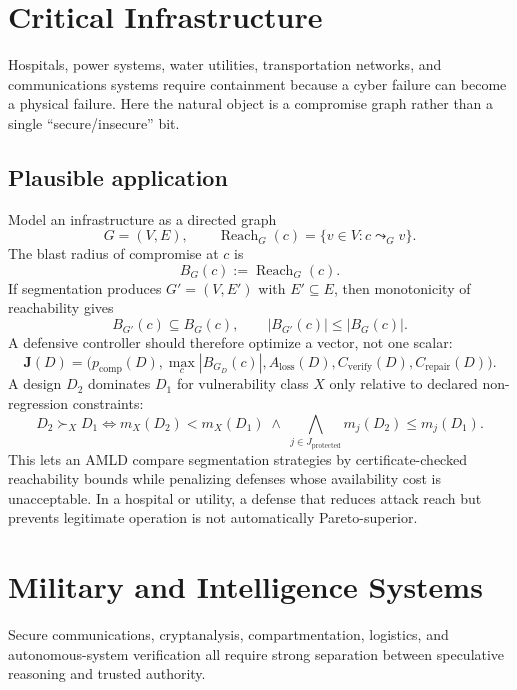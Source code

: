 \documentclass[11pt]{article}
\newcommand{\Reach}{\operatorname{Reach}}
\begin{document}
\section{Critical Infrastructure}
Hospitals, power systems, water utilities, transportation networks, and communications systems require
containment because a cyber failure can become a physical failure. Here the natural object is a
compromise graph rather than a single ``secure/insecure'' bit.

\subsection*{Plausible application}
Model an infrastructure as a directed graph
\[
G=(V,E),\qquad
\Reach_G(c)=\{v\in V:c\leadsto_G v\}.
\]
The blast radius of compromise at \(c\) is
\[
B_G(c):=\Reach_G(c).
\]
If segmentation produces \(G'=(V,E')\) with \(E'\subseteq E\), then monotonicity of reachability gives
\[
B_{G'}(c)\subseteq B_G(c),
\qquad
|B_{G'}(c)|\le |B_G(c)|.
\]
A defensive controller should therefore optimize a vector, not one scalar:
\[
\mathbf J(D)=
\bigl(
p_{\mathrm{comp}}(D),
\max_c |B_{G_D}(c)|,
A_{\mathrm{loss}}(D),
C_{\mathrm{verify}}(D),
C_{\mathrm{repair}}(D)
\bigr).
\]
A design \(D_2\) dominates \(D_1\) for vulnerability class \(X\) only relative to declared
non-regression constraints:
\[
D_2\succ_X D_1
\iff
m_X(D_2)<m_X(D_1)
\;\land\;
\bigwedge_{j\in J_{\mathrm{protected}}}
m_j(D_2)\le m_j(D_1).
\]
This lets an AMLD compare segmentation strategies by certificate-checked reachability bounds while
penalizing defenses whose availability cost is unacceptable. In a hospital or utility, a defense that
reduces attack reach but prevents legitimate operation is not automatically Pareto-superior.

\section{Military and Intelligence Systems}
Secure communications, cryptanalysis, compartmentation, logistics, and autonomous-system verification
all require strong separation between speculative reasoning and trusted authority.
\end{document}
